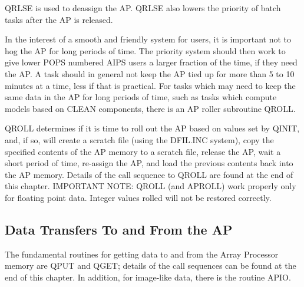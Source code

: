 QRLSE is used to deassign the AP.  QRLSE also lowers the priority of
batch tasks after the AP is released.

In the interest of a smooth and friendly system for users, it is
important not to hog the AP for long periods of time.  The priority
system should then work to give lower POPS numbered AIPS users a
larger fraction of the time, if they need the AP.  A task should in
general not keep the AP tied up for more than 5 to 10 minutes at a
time, less if that is practical.  For tasks which may need to keep the
same data in the AP for long periods of time, such as tasks which
compute models based on CLEAN components, there is an AP roller
subroutine QROLL.

QROLL determines if it is time to roll out the AP based on values
set by QINIT, and, if so, will create a scratch file (using the
DFIL.INC system), copy the specified contents of the AP
memory to a scratch file, release the AP, wait a short period of
time, re-assign the AP, and load the previous contents back into the
AP memory.  Details of the call sequence to QROLL are found at the
end of this chapter.
\hfil\linebreak
IMPORTANT NOTE:  QROLL (and APROLL) work properly only for floating
point data.  Integer values rolled will not be restored correctly.

\subsection{Data Transfers To and From the AP }
The fundamental routines for getting data to and from the Array
Processor memory are QPUT and QGET; details of the call sequences can
be found at the end of this chapter.  In addition, for image-like
data, there is the routine APIO.

